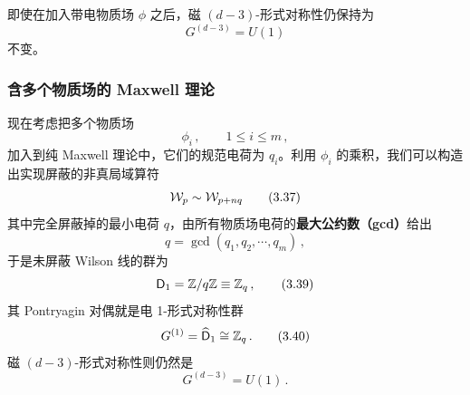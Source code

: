 

 即使在加入带电物质场 $\phi$ 之后，磁 $(d-3)$-形式对称性仍保持为
\begin{equation}
  G^{(d-3)}=U(1) \tag{3.35}
\end{equation}
不变。

\subsubsection{含多个物质场的 Maxwell 理论}

现在考虑把多个物质场
\begin{equation}
  \phi_i\,,\qquad 1\le i\le m\,, \tag{3.36}
\end{equation}
加入到纯 Maxwell 理论中，它们的规范电荷为 $q_i$。利用 $\phi_i$ 的乘积，我们可以构造出实现屏蔽的非真局域算符
\begin{equation}
  \mathcal{W}_p\sim \mathcal{W}_{p+nq} \tag{3.37}
\end{equation}
其中完全屏蔽掉的最小电荷 $q$，由所有物质场电荷的\textbf{最大公约数（gcd）}给出
\begin{equation}
  q=\gcd(q_1,q_2,\cdots,q_m)\,, \tag{3.38}
\end{equation}
于是未屏蔽 Wilson 线的群为
\begin{equation}
  \mathsf{D}_1=\mathbb{Z}/q\mathbb{Z}\equiv\mathbb{Z}_q\,, \tag{3.39}
\end{equation}
其 Pontryagin 对偶就是电 1-形式对称性群
\begin{equation}
  G^{(1)}=\widehat{\mathsf{D}}_1\cong\mathbb{Z}_q\,. \tag{3.40}
\end{equation}
磁 $(d-3)$-形式对称性则仍然是
\begin{equation}
  G^{(d-3)}=U(1)\,. \tag{3.41}
\end{equation}
